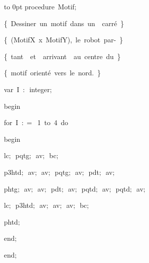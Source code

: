 {\pagebreak[3] 
\vbox to 0pt{\vspace*{3cm}\noindent{}}%
\vspace{\neglskip}\mbox{\blc  \blk\idt  \mcl procedure\idt \ Motif$;$}\par 
\vspace{\neglskip}\mbox{\blc  \blk\blk\idt  \cmt  \{\ Dessiner\ un\ motif\ dans\ un\ \ carré\ \}\idt }\par 
\vspace{\neglskip}\mbox{\blc  \blk\blk\idt  \cmt  \{\ (MotifX\ x\ MotifY),\ le\ robot\ par-\ \}\idt }\par 
\vspace{\neglskip}\mbox{\blc  \blk\blk\idt  \cmt  \{\ tant\ \ et\ \ arrivant\ \ au\ centre\ du\ \}\idt }\par 
\vspace{\neglskip}\mbox{\blc  \blk\blk\idt  \cmt  \{\ motif\ orienté\ vers\ le\ nord.\ \}\idt }\par 
\pagebreak[3] 
\vspace{\neglskip}\mbox{\blc  \blk\blk\idt  \mcl var\idt \ I\ $:$\ integer$;$}\par 
\vspace{\neglskip}\mbox{\blc  \blk\idt  \mcl begin\idt }\par 
\pagebreak[3] 
\vspace{\neglskip}\mbox{\blc  \blk\blk\idt  \mcl for\idt \ I\ $:$$=$\ 1\ \mcl to\idt \ 4\ \mcl do\idt }\par 
\vspace{\neglskip}\mbox{\blc  \blk\blk\blk\idt  \mcl begin\idt }\par 
\vspace{\neglskip}\mbox{\blc  \blk\blk\blk\blk\idt  lc$;$\ pqtg$;$\ av$;$\ bc$;$\ }\par 
\vspace{\neglskip}\mbox{\blc  \blk\blk\blk\blk\idt  p3htd$;$\ av$;$\ av$;$\ pqtg$;$\ av$;$\ pdt$;$\ av$;$\ }\par 
\vspace{\neglskip}\mbox{\blc  \blk\blk\blk\blk\idt  phtg$;$\ av$;$\ av$;$\ pdt$;$\ av$;$\ pqtd$;$\ av$;$\ pqtd$;$\ av$;$\ }\par 
\vspace{\neglskip}\mbox{\blc  \blk\blk\blk\blk\idt  lc$;$\ p3htd$;$\ av$;$\ av$;$\ av$;$\ bc$;$}\par 
\vspace{\neglskip}\mbox{\blc  \blk\blk\blk\blk\idt  phtd$;$\ \ }\par 
\vspace{\neglskip}\mbox{\blc  \blk\blk\idt  \mcl end\idt $;$}\par 
\vspace{\neglskip}\mbox{\blc  \blk\idt  \mcl end\idt $;$\ }\par 
\medskip

}
